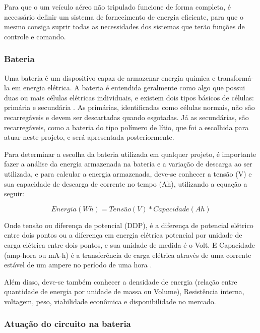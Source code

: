
Para que o um veículo aéreo não tripulado funcione de forma completa, é necessário definir um sistema de fornecimento de energia eficiente, para que o mesmo consiga suprir todas as necessidades dos sistemas que terão funções de controle e comando.

\subsubsection{Bateria}

Uma bateria é um dispositivo capaz de armazenar energia química e transformá-la em energia elétrica. A bateria é entendida geralmente como algo que possui duas ou mais células elétricas individuais, e existem dois tipos básicos de células: primária e secundária \cite{gibbs}. As primárias, identificadas como células normais, não são recarregáveis e devem ser descartadas quando esgotadas. Já as secundárias, são recarregáveis, como a bateria do tipo polímero de lítio, que foi a escolhida para atuar neste projeto, e será apresentada posteriormente. 

Para determinar a escolha da bateria utilizada em qualquer projeto, é importante fazer a análise  da energia armazenada na bateria e a variação de descarga ao ser utilizada, e para calcular a energia armazenada, deve-se conhecer a tensão (V) e sua capacidade de descarga de corrente no tempo (Ah), utilizando a equação a seguir: \cite{peixoto}

\begin{equation}
  Energia(Wh)= Tensão(V)*Capacidade(Ah)
\end{equation}

Onde tensão ou diferença de potencial (DDP), é a diferença de potencial elétrico entre dois pontos ou a diferença em energia elétrica potencial por unidade de carga elétrica entre dois pontos, e sua unidade de medida é o Volt. E Capacidade (amp-hora ou mA-h) é a transferência de carga elétrica através de uma corrente estável de um ampere no período de uma hora \cite{gibbs}.

Além disso, deve-se também conhecer a densidade de energia (relação entre quantidade de energia por unidade de massa ou Volume), Resistência interna, voltagem, peso, viabilidade econômica e disponibilidade no mercado.


\subsubsection{Atuação do circuito na bateria}

